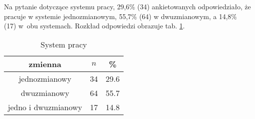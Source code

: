 Na pytanie dotyczące systemu pracy, 29,6\% (34) ankietowanych odpowiedziało, że pracuje w systemie jednozmianowym, 55,7\% (64) w dwuzmianowym, a 14,8\% (17) w~obu systemach. Rozkład odpowiedzi obrazuje tab. \ref{tab:Q4}.

\begin{table}[H]
\caption{System pracy}
\centering
\begin{tabular}{ | c | c | c |}
\hline
zmienna & $n$ & \% \\
\hline
jednozmianowy  &  34  & 29.6 \\
\hline
dwuzmianowy  &  64  & 55.7 \\
\hline
jedno i dwuzmianowy  &  17  & 14.8 \\
\hline
\end{tabular}
\label{tab:Q4}
\end{table}

